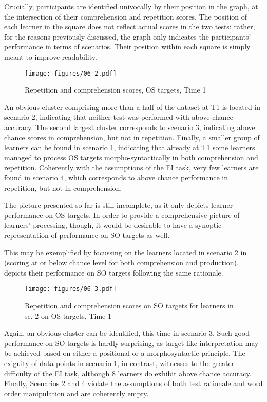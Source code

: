 Crucially, participants are identified univocally by their position in the graph, at the intersection of their comprehension and repetition scores. The position of each learner in the square does not reflect actual scores in the two tests: rather, for the reasons previously discussed, the graph only indicates the participants’ performance in terms of scenarios. Their position within each square is simply meant to improve readability. 

\begin{figure}
    \texttt{[image: figures/06-2.pdf]}
    \caption{Repetition and comprehension scores, OS targets, Time 1}
    \label{fig:06:2}
\end{figure}

An obvious cluster comprising more than a half of the dataset at T1 is located in scenario 2, indicating that neither test was performed with above chance accuracy. The second largest cluster corresponds to scenario 3, indicating above chance scores in comprehension, but not in repetition. Finally, a smaller group of learners can be found in scenario 1, indicating that already at T1 some learners managed to process OS targets morpho-syntactically in both comprehension and repetition. Coherently with the assumptions of the EI task, very few learners are found in scenario 4, which corresponds to above chance performance in repetition, but not in comprehension.

The picture presented so far is still incomplete, as it only depicts learner performance on OS targets. In order to provide a comprehensive picture of learners' processing, though, it would be desirable to have a synoptic representation of performance on SO targets as well. 

This may be exemplified by focussing on the learners located in scenario 2 in  (scoring at or below chance level for both comprehension and production).  depicts their performance on SO targets following the same rationale. 

\begin{figure}
    \texttt{[image: figures/06-3.pdf]}
    \caption{Repetition and comprehension scores on SO targets for learners in sc. 2 on OS targets, Time 1}
    \label{fig:06:3}
\end{figure}

Again, an obvious cluster can be identified, this time in scenario 3. Such good performance on SO targets is hardly surprising, as target-like interpretation may be achieved based on either a positional or a morphosyntactic principle. The exiguity of data points in scenario 1, in contrast, witnesses to the greater difficulty of the EI task, although 8 learners do exhibit above chance accuracy. Finally, Scenarios 2 and 4 violate the assumptions of both test rationale and word order manipulation and are coherently empty.

